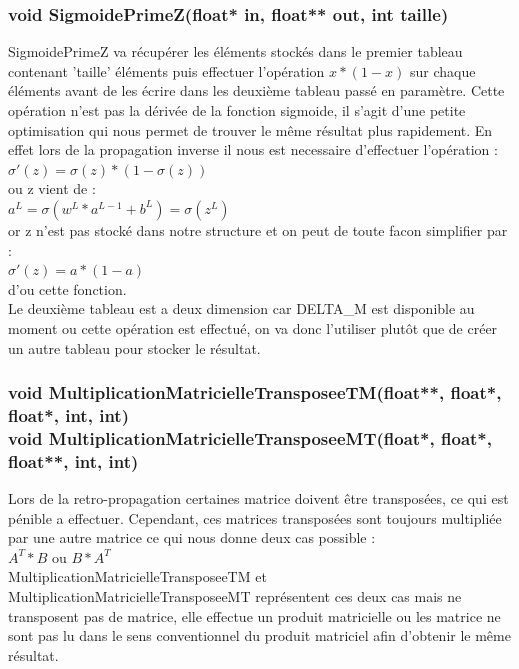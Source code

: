 \documentclass{article}
\begin{document}
			\subsubsection{\textcolor{myblue}{\textbf{void}} SigmoidePrimeZ(\textcolor{myblue}{\textbf{float*}} in, \textcolor{myblue}{\textbf{float**}} out, \textcolor{myblue}{\textbf{int}} taille)}
			SigmoidePrimeZ va récupérer les éléments stockés dans le premier tableau contenant 'taille' éléments puis effectuer l'opération $x*(1-x)$ sur chaque éléments avant de les écrire dans les deuxième tableau passé en paramètre. Cette opération n'est pas la dérivée de la fonction sigmoide, il s'agit d'une petite optimisation qui nous permet de trouver le même résultat plus rapidement. En effet lors de la propagation inverse il nous est necessaire d'effectuer l'opération : \\$\sigma'(z) = \sigma(z)*(1-\sigma(z))$\\ ou z vient de : \\$a^L = \sigma(w^L*a^{L-1}+b^L) = \sigma(z^L)$\\ or z n'est pas stocké dans notre structure et on peut de toute facon simplifier par :\\$\sigma'(z)=a*(1-a)$\\ d'ou cette fonction.\\
			Le deuxième tableau est a deux dimension car DELTA\_M est disponible au moment ou cette opération est effectué, on va donc l'utiliser plutôt que de créer un autre tableau pour stocker le résultat.
			
			\subsubsection{\textcolor{myblue}{\textbf{void}} MultiplicationMatricielleTransposeeTM(\textcolor{myblue}{\textbf{float**}},  \textcolor{myblue}{\textbf{float*}},  \textcolor{myblue}{\textbf{float*}},  \textcolor{myblue}{\textbf{int}},  \textcolor{myblue}{\textbf{int}})\\
			\textcolor{myblue}{\textbf{void}} MultiplicationMatricielleTransposeeMT(\textcolor{myblue}{\textbf{float*}},  \textcolor{myblue}{\textbf{float*}},  \textcolor{myblue}{\textbf{float**}},  \textcolor{myblue}{\textbf{int}},  \textcolor{myblue}{\textbf{int}})}
				Lors de la retro-propagation certaines matrice doivent être transposées, ce qui est pénible a effectuer. Cependant, ces matrices transposées sont toujours multipliée par une autre matrice ce qui nous donne deux cas possible : \\$A^T*B$ ou $B*A^T$\\MultiplicationMatricielleTransposeeTM et MultiplicationMatricielleTransposeeMT représentent ces deux cas mais ne transposent pas de matrice, elle effectue un produit matricielle ou les matrice ne sont pas lu dans le sens conventionnel du produit matriciel afin d'obtenir le même résultat.
				
\end{document}
